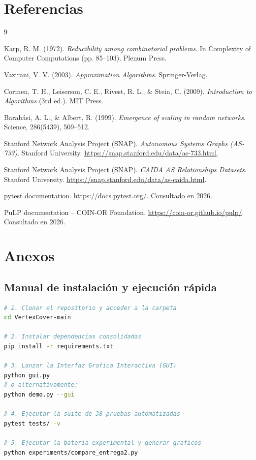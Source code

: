 \documentclass[11pt,a4paper]{article}
\begin{document}
\section{Referencias}
\begin{thebibliography}{9}

Karp, R. M. (1972). \emph{Reducibility among combinatorial problems}. In Complexity of Computer Computations (pp. 85--103). Plenum Press.

Vazirani, V. V. (2003). \emph{Approximation Algorithms}. Springer-Verlag.

Cormen, T. H., Leiserson, C. E., Rivest, R. L., \& Stein, C. (2009). \emph{Introduction to Algorithms} (3rd ed.). MIT Press.

Barabási, A. L., \& Albert, R. (1999). \emph{Emergence of scaling in random networks}. Science, 286(5439), 509--512.

Stanford Network Analysis Project (SNAP). \emph{Autonomous Systems Graphs (AS-733)}. Stanford University. \url{https://snap.stanford.edu/data/as-733.html}.

Stanford Network Analysis Project (SNAP). \emph{CAIDA AS Relationships Datasets}. Stanford University. \url{https://snap.stanford.edu/data/as-caida.html}.

pytest documentation. \url{https://docs.pytest.org/}. Consultado en 2026.

PuLP documentation -- COIN-OR Foundation. \url{https://coin-or.github.io/pulp/}. Consultado en 2026.

\end{thebibliography}

\section{Anexos}

\subsection{Manual de instalación y ejecución rápida}
\begin{lstlisting}[language=bash]
# 1. Clonar el repositorio y acceder a la carpeta
cd VertexCover-main

# 2. Instalar dependencias consolidadas
pip install -r requirements.txt

# 3. Lanzar la Interfaz Grafica Interactiva (GUI)
python gui.py
# o alternativamente:
python demo.py --gui

# 4. Ejecutar la suite de 38 pruebas automatizadas
pytest tests/ -v

# 5. Ejecutar la bateria experimental y generar graficos
python experiments/compare_entrega2.py
\end{lstlisting}
\end{document}
